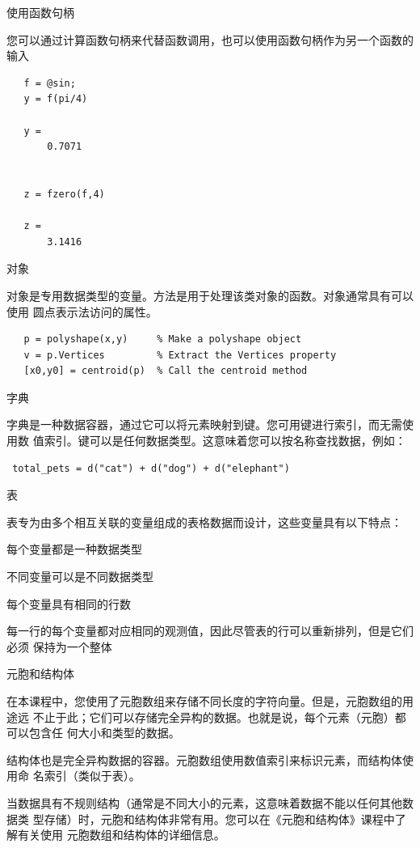 \documentclass[12pt,a4paper]{article}
\begin{document}
使用函数句柄

您可以通过计算函数句柄来代替函数调用，也可以使用函数句柄作为另一个函数的输入

\begin{lstlisting}
   f = @sin;
   y = f(pi/4)
   
   y =
       0.7071


   z = fzero(f,4)

   z =
       3.1416
\end{lstlisting}

对象

对象是专用数据类型的变量。方法是用于处理该类对象的函数。对象通常具有可以使用
圆点表示法访问的属性。

\begin{lstlisting}
   p = polyshape(x,y)     % Make a polyshape object
   v = p.Vertices         % Extract the Vertices property
   [x0,y0] = centroid(p)  % Call the centroid method
\end{lstlisting}

字典

字典是一种数据容器，通过它可以将元素映射到键。您可用键进行索引，而无需使用数
值索引。键可以是任何数据类型。这意味着您可以按名称查找数据，例如：

\begin{lstlisting}
 total_pets = d("cat") + d("dog") + d("elephant")
\end{lstlisting}
  
表

表专为由多个相互关联的变量组成的表格数据而设计，这些变量具有以下特点：

每个变量都是一种数据类型

不同变量可以是不同数据类型

每个变量具有相同的行数

每一行的每个变量都对应相同的观测值，因此尽管表的行可以重新排列，但是它们必须
保持为一个整体

元胞和结构体

在本课程中，您使用了元胞数组来存储不同长度的字符向量。但是，元胞数组的用途远
不止于此；它们可以存储完全异构的数据。也就是说，每个元素（元胞）都可以包含任
何大小和类型的数据。

结构体也是完全异构数据的容器。元胞数组使用数值索引来标识元素，而结构体使用命
名索引（类似于表）。

当数据具有不规则结构（通常是不同大小的元素，这意味着数据不能以任何其他数据类
型存储）时，元胞和结构体非常有用。您可以在《元胞和结构体》课程中了解有关使用
元胞数组和结构体的详细信息。
\end{document}

